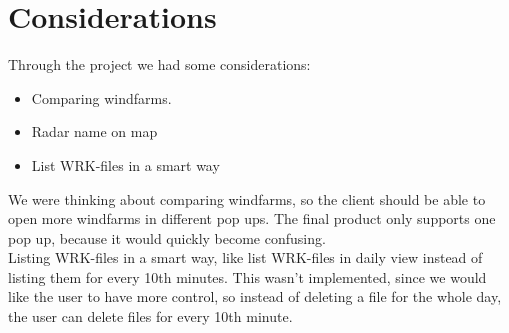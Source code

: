 \chapter{Considerations}
Through the project we had some considerations:
\begin{itemize}
\item Comparing windfarms.
\item Radar name on map
\item List WRK-files in a smart way
\end{itemize}
We were thinking about comparing windfarms, so the client should be able to open more windfarms in different pop ups. The final product only supports one pop up, because it would quickly become confusing.\\
Listing WRK-files in a smart way, like list WRK-files in daily view instead of listing them for every 10th minutes. This wasn't implemented, since we would like the user to have more control, so instead of deleting a file for the whole day, the user can delete files for every 10th minute.